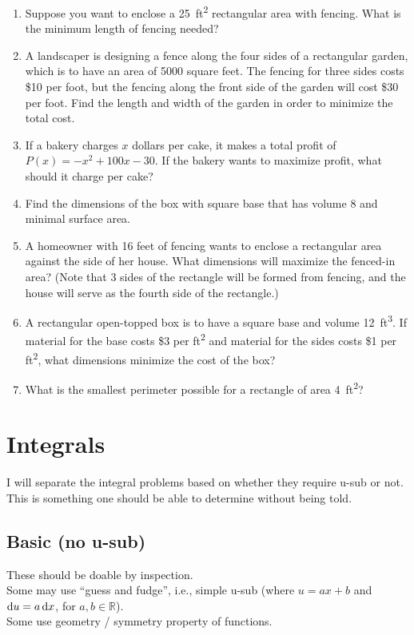 \documentclass[10pt]{scrartcl}
\theoremstyle{definition}
\newcommand{\RR}{\mathbb{R}}
\begin{document}
\begin{enumerate}
\item [2016 Spring Final] Suppose you want to enclose a \SI{25}{ft^2} rectangular area with fencing. What is the minimum length of fencing needed?
\item [2015 Fall Exam 3] A landscaper is designing a fence along the four sides of a rectangular garden, which is to have an area of 5000 square feet. The fencing for three sides costs \$10 per foot, but the fencing along the front side of the garden will cost \$30 per foot. Find the length and width of the garden in order to minimize the total cost.
\item [2015 Spring Exam 3] If a bakery charges $x$ dollars per cake, it makes a total profit of $P(x) = -x^2 + 100 x - 30$. If the bakery wants to maximize profit, what should it charge per cake?
\item [2015 Spring Exam 3] Find the dimensions of the box with square base that has volume 8 and minimal surface area.
\item [2014 Fall Exam 3] A homeowner with 16 feet of fencing wants to enclose a rectangular area against the side of her house. What dimensions will maximize the fenced-in area? (Note that 3 sides of the rectangle will be formed from fencing, and the house will serve as the fourth side of the rectangle.)
\item [2014 Fall Exam 3] A rectangular open-topped box is to have a square base and volume \SI{12}{ft^3}. If material for the base costs \$3 per \si{ft^2} and material for the sides costs \$1 per \si{ft^2}, what dimensions minimize the cost of the box?
\item [2014 Spring Exam 3] What is the smallest perimeter possible for a rectangle of area \SI{4}{ft^2}?
\end{enumerate}

\newpage
\section{Integrals}
I will separate the integral problems based on whether they require u-sub or not.
This is something one should be able to determine without being told.

\subsection{Basic (no u-sub)}
These should be doable by inspection. \\
Some may use ``guess and fudge'', i.e., simple u-sub (where $u = ax + b$ and $\dif u = a \dif x$, for $a,b\in\RR$). \\
Some use geometry / symmetry property of functions.
\end{document}
